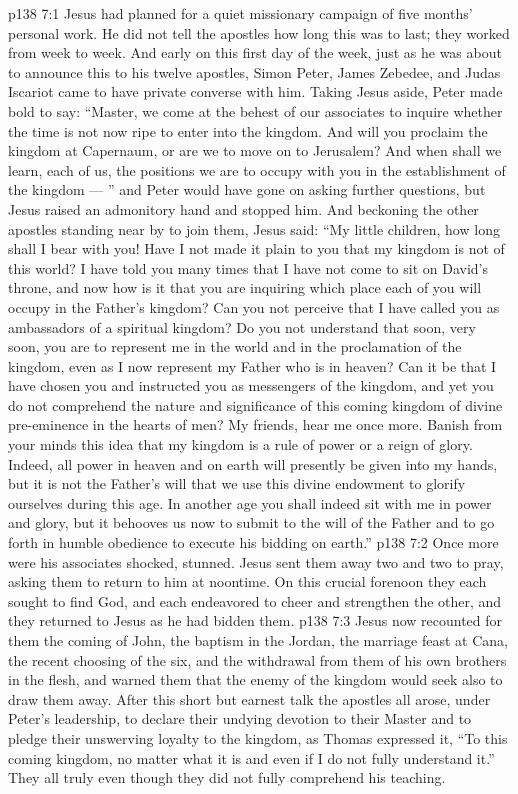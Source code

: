 \vs p138 7:1 Jesus had planned for a quiet missionary campaign of five months’ personal work. He did not tell the apostles how long this was to last; they worked from week to week. And early on this first day of the week, just as he was about to announce this to his twelve apostles, Simon Peter, James Zebedee, and Judas Iscariot came to have private converse with him. Taking Jesus aside, Peter made bold to say: “Master, we come at the behest of our associates to inquire whether the time is not now ripe to enter into the kingdom. And will you proclaim the kingdom at Capernaum, or are we to move on to Jerusalem? And when shall we learn, each of us, the positions we are to occupy with you in the establishment of the kingdom --- ” and Peter would have gone on asking further questions, but Jesus raised an admonitory hand and stopped him. And beckoning the other apostles standing near by to join them, Jesus said: \textcolor{ubdarkred}{“My little children, how long shall I bear with you! Have I not made it plain to you that my kingdom is not of this world? I have told you many times that I have not come to sit on David’s throne, and now how is it that you are inquiring which place each of you will occupy in the Father’s kingdom? Can you not perceive that I have called you as ambassadors of a spiritual kingdom? Do you not understand that soon, very soon, you are to represent me in the world and in the proclamation of the kingdom, even as I now represent my Father who is in heaven? Can it be that I have chosen you and instructed you as messengers of the kingdom, and yet you do not comprehend the nature and significance of this coming kingdom of divine pre\hyp{}eminence in the hearts of men? My friends, hear me once more. Banish from your minds this idea that my kingdom is a rule of power or a reign of glory. Indeed, all power in heaven and on earth will presently be given into my hands, but it is not the Father’s will that we use this divine endowment to glorify ourselves during this age. In another age you shall indeed sit with me in power and glory, but it behooves us now to submit to the will of the Father and to go forth in humble obedience to execute his bidding on earth.”}
\vs p138 7:2 Once more were his associates shocked, stunned. Jesus sent them away two and two to pray, asking them to return to him at noontime. On this crucial forenoon they each sought to find God, and each endeavored to cheer and strengthen the other, and they returned to Jesus as he had bidden them.
\vs p138 7:3 Jesus now recounted for them the coming of John, the baptism in the Jordan, the marriage feast at Cana, the recent choosing of the six, and the withdrawal from them of his own brothers in the flesh, and warned them that the enemy of the kingdom would seek also to draw them away. After this short but earnest talk the apostles all arose, under Peter’s leadership, to declare their undying devotion to their Master and to pledge their unswerving loyalty to the kingdom, as Thomas expressed it, “To this coming kingdom, no matter what it is and even if I do not fully understand it.” They all truly  even though they did not fully comprehend his teaching.
